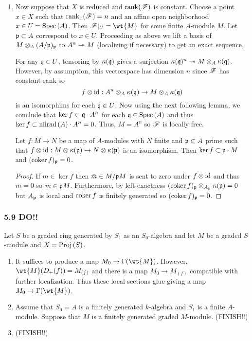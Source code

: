 \documentclass[12pt]{article}
\begin{document}
\begin{enumerate}
\item Now suppose that $X$ is reduced and $\mathrm{rank}(\mathscr{F})$ is constant. Choose a point $x \in X$ such that $\mathrm{rank}_x(\mathscr{F}) = n$ and an affine open neighborhood $x \in U = \mathrm{Spec}\left( A \right)$. Then $\F|_U = \wt{M}$ for some finite $A$-module $M$. Let $\mathfrak{p} \subset A$ correspond to $x \in U$. Proceeding as above we lift a basis of $M \otimes_A (A/\mathfrak{p})_{\mathfrak{p}}$ to $A^n \twoheadrightarrow M$ (localizing if necessary) to get an exact sequence,
\begin{center}
\end{center}
For any $\mathfrak{q} \in U$, tensoring by $\kappa(\mathfrak{q})$ gives a surjection $\kappa(\mathfrak{q})^n \twoheadrightarrow M \otimes_{A} \kappa(\mathfrak{q})$. However, by assumption, this vectorspace has dimension $n$ since $\mathscr{F}$ has constant rank so
\[ f \otimes \mathrm{id} : A^n \otimes_{A} \kappa(\mathfrak{q}) \to M \otimes_{A} \kappa(\mathfrak{q}) \]
is an isomorphims for each $\mathfrak{q} \in U$. 
Now using the next following lemma, we conclude that $\ker{f} \subset \mathfrak{q} \cdot A^n$ for each $\mathfrak{q} \in \mathrm{Spec}\left( A \right)$ and thus $\ker{f} \subset \mathrm{nilrad}\left( A \right) \cdot A^n = 0$. Thus, $M = A^n$ so $\mathscr{F}$ is locally free.

\begin{lemma}
Let $f : M \to N$ be a map of $A$-modules with $N$ finite and $\mathfrak{p} \subset A$ prime such that $f \otimes \mathrm{id} : M \otimes \kappa(\mathfrak{p}) \to N \otimes \kappa(\mathfrak{p})$ is an isomorphism. Then $\ker{f} \subset \mathfrak{p} \cdot M$ and $(\operatorname{\mathrm{coker}}{f})_{\mathfrak{p}} = 0$.
\end{lemma}

\begin{proof}
If $m \in \ker{f}$ then $\bar{m} \in M/\mathfrak{p} M$ is sent to zero under $f \otimes \mathrm{id}$ and thus $\bar{m} = 0$ so $m \in \mathfrak{p} M$. Furthermore, by left-exactness $(\operatorname{\mathrm{coker}}{f})_{\mathfrak{p}} \otimes_{A_{\mathfrak{p}}} \kappa(\mathfrak{p}) = 0$ but $A_{\mathfrak{p}}$ is local and $\operatorname{\mathrm{coker}}{f}$ is finitely generated so $(\operatorname{\mathrm{coker}}{f})_{\mathfrak{p}} = 0$. 
\end{proof}
\end{enumerate}

\subsubsection{5.9 DO!!} 

Let $S$ be a graded ring generated by $S_1$ as an $S_0$-algebra and let $M$ be a graded $S$-module and $X = \mathrm{Proj}\left( S \right)$.

\begin{enumerate}
\item It suffices to produce a map $M_0 \to \Gamma(\wt{M})$. However, $\wt{M}(D_{+}(f)) = M_{(f)}$ and there is a map $M_0 \to M_{(f)}$ compatible with further localization. Thus these local sections glue giving a map $M_0 \to \Gamma(\wt{M})$.
\item Assume that $S_0 = A$ is a finitely generated $k$-algebra and $S_1$ is a finite $A$-module. Suppose that $M$ is a finitely generated graded $M$-module. (FINISH!!)

\item (FINISH!!)
\end{enumerate}
\end{document}
